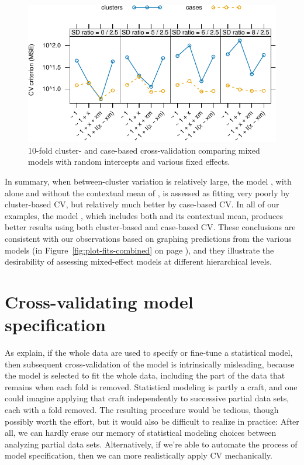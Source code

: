 \documentclass[
]{jss}
\begin{document}
\begin{CodeChunk}
\begin{figure}

{\centering \includegraphics[width=0.75\linewidth]{Figures/cross-validation-data-plot-1}

}

\caption[10-fold cluster- and case-based cross-validation comparing mixed models with random intercepts and various fixed effects]{10-fold cluster- and case-based cross-validation comparing mixed models with random intercepts and various fixed effects.}\label{fig:cross-validation-data-plot}
\end{figure}
\end{CodeChunk}

In summary, when between-cluster variation is relatively large, the
model , with  alone and without the contextual
mean  of , is assessed as fitting very poorly by
cluster-based CV, but relatively much better by case-based CV. In all of
our examples, the model , which includes both
 and its contextual mean, produces better results using both
cluster-based and case-based CV. These conclusions are consistent with
our observations based on graphing predictions from the various models
(in Figure~\ref{fig:plot-fits-combined} on page
\pageref{fig:plot-fits-combined}), and they illustrate the desirability
of assessing mixed-effect models at different hierarchical levels.

\section{Cross-validating model
specification}\label{cross-validating-model-specification}

As \citet[Sec.~7.10.2: ``The Wrong and Right Way to Do
Cross-validation'']{HastieTibshiraniFriedman:2009} explain, if the whole
data are used to specify or fine-tune a statistical model, then
subsequent cross-validation of the model is intrinsically misleading,
because the model is selected to fit the whole data, including the part
of the data that remains when each fold is removed. Statistical modeling
is partly a craft, and one could imagine applying that craft
independently to successive partial data sets, each with a fold removed.
The resulting procedure would be tedious, though possibly worth the
effort, but it would also be difficult to realize in practice: After
all, we can hardly erase our memory of statistical modeling choices
between analyzing partial data sets. Alternatively, if we're able to
automate the process of model specification, then we can more
realistically apply CV mechanically.
\end{document}
